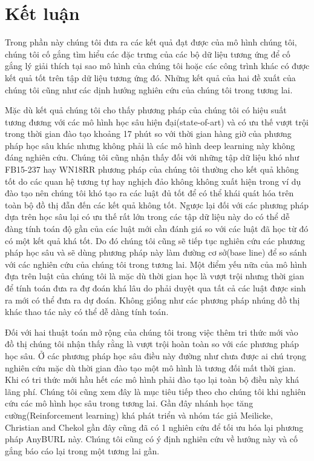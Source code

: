 \section{Kết luận}
Trong phần này chúng tôi đưa ra các kết quả đạt được của mô hình chúng tôi, chúng tôi cố gắng tìm hiểu các đặc trưng của các bộ dữ liệu tương ứng để cố gắng lý giải thích tại sao mô hình của chúng tôi hoặc các công trình khác có được kết quả tốt trên tập dữ liệu tương ứng đó. Những kết quả của hai đề xuất của chúng tôi cũng như các dịnh hướng nghiên cứu của chúng tôi trong tương lai.

Mặc dù kết quả chúng tôi cho thấy phương pháp của chúng tôi có hiệu suất tương đương với các mô hình học sâu hiện đại(state-of-art) và có ưu thế vượt trội trong thời gian đào tạo khoảng 17 phút so với thời gian hàng giờ của phương pháp học sâu khác nhưng không phải là các mô hình deep learning này không đáng nghiên cứu. Chúng tôi cũng nhận thấy đối với những tập dữ liệu khó như FB15-237 hay WN18RR phương pháp của chúng tôi thường cho kết quả không tốt do các quan hệ tương tự hay nghịch đảo không không xuất hiện trong ví dụ đào tạo nên chúng tôi khó tạo ra các luật đủ tốt để có thể khái quát hóa trên toàn bộ đồ thị đẫn đến các kết quả không tốt. Ngược lại đối với các phương pháp dựa trên học sâu lại có ưu thế rất lớn trong các tập dữ liệu này do có thể dễ đàng tính toán độ gần của các luật mới cần đánh giá so với các luật đã học từ đó có một kết quả khá tốt. Do đó chúng tôi cũng sẽ tiếp tục nghiên cứu các phương pháp học sâu và sẽ dùng phương pháp này làm đường cơ sở(base line) để so sánh với các nghiên cứu của chúng tôi trong tương lai. Một điểm yếu nữa của mô hình đựa trên luật của chúng tôi là mặc dù thời gian học là vượt trội nhưng thời gian để tính toán đưa ra đự đoán khá lâu do phải duyệt qua tất cả các luật được sinh ra mới có thể đưa ra dự đoán. Không giống như các phương pháp nhúng đồ thị khác thao tác này có thể dễ dàng tính toán.

Đối với hai thuật toán mở rộng của chúng tôi trong việc thêm tri thức mới vào đồ thị chúng tôi nhận thấy rằng là vượt trội hoàn toàn so với các phương pháp học sâu. Ở các phương pháp học sâu điều này đường như chưa được ai chú trọng nghiên cứu mặc dù thời gian đào tạo một mô hình là tương đối mất thời gian. Khi có tri thức mới hầu hết các mô hình phải đào tạo lại toàn bộ điều này khá lãng phí. Chúng tôi cũng xem đây là mục tiêu tiếp theo cho chúng tôi khi nghiên cứu các mô hình học sâu trong tương lai. Gần đây nhánh học tăng cường(Reinforcement learning) khá phát triển và nhóm tác giả Meilicke, Christian and Chekol \cite{meilicke2020reinforced} gần đây cũng đã có 1 nghiên cứu để tối ưu hóa lại phương pháp AnyBURL này. Chúng tôi cũng có ý định nghiên cứu về hướng này và cố gắng báo cáo lại trong một tương lai gần. 


